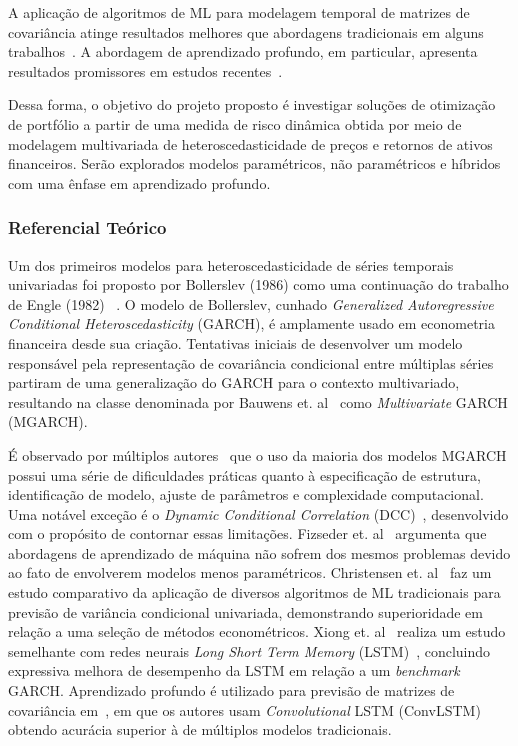 \documentclass[a4paper, 12pt]{article}
\begin{document}
\begin{spacing}{.9}
A aplicação de algoritmos de ML para modelagem temporal de matrizes de
covariância atinge resultados melhores que abordagens tradicionais em
alguns trabalhos~\cite{svr, ann}. A abordagem de aprendizado profundo, em
particular, apresenta resultados promissores em estudos
recentes~\cite{dl_multi, dl2, fang2021cnn}.

Dessa forma, o objetivo do projeto proposto é investigar soluções de otimização
de portfólio a partir de uma medida de risco dinâmica obtida por meio de
modelagem multivariada de heteroscedasticidade de preços e retornos de
ativos financeiros. Serão explorados modelos paramétricos, não paramétricos
e híbridos com uma ênfase em aprendizado profundo.

\subsubsection*{Referencial Teórico}

Um dos primeiros modelos para heteroscedasticidade de séries temporais
univariadas foi proposto por Bollerslev (1986) como uma continuação do trabalho
de Engle (1982) ~\cite{garch}. O modelo de Bollerslev, cunhado
\emph{Generalized Autoregressive Conditional Heteroscedasticity} (GARCH), é
amplamente usado em econometria financeira desde sua criação. Tentativas
iniciais de desenvolver um modelo responsável pela representação de covariância
condicional entre múltiplas séries partiram de uma generalização do GARCH para
o contexto multivariado, resultando na classe denominada por Bauwens et.
al~\cite{bauwens} como \emph{Multivariate} GARCH (MGARCH).

É observado por múltiplos autores~\cite{bauwens, morettin} que o uso da maioria
dos modelos MGARCH possui uma série de dificuldades práticas quanto à
especificação de estrutura, identificação de modelo, ajuste de parâmetros e
complexidade computacional. Uma notável exceção é o \emph{Dynamic Conditional
Correlation} (DCC)~\cite{dcc}, desenvolvido com o propósito de contornar essas
limitações. Fizseder et. al~\cite{svr} argumenta que abordagens de aprendizado
de máquina não sofrem dos mesmos problemas devido ao fato de envolverem modelos
menos paramétricos. Christensen et. al~\cite{christensen} faz um estudo
comparativo da aplicação de diversos algoritmos de ML tradicionais para
previsão de variância condicional univariada, demonstrando superioridade em
relação a uma seleção de métodos econométricos. Xiong et. al~\cite{xiong}
realiza um estudo semelhante com redes neurais \emph{Long Short Term Memory}
(LSTM)~\cite{LSTM}, concluindo expressiva melhora de desempenho da LSTM em relação a um
\emph{benchmark} GARCH. Aprendizado profundo é utilizado para previsão de
matrizes de covariância em~\cite{fang2021cnn}, em que os autores usam
\emph{Convolutional} LSTM (ConvLSTM)~\cite{convlstm} obtendo acurácia superior
à de múltiplos modelos tradicionais.



\end{spacing}
\end{document}
